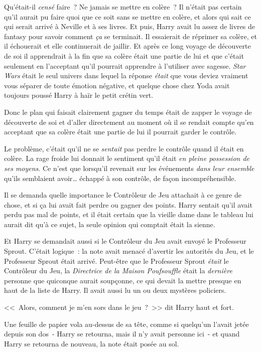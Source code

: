Qu'était-il \emph{censé} faire~? Ne jamais se mettre en colère~? Il n'était pas certain qu'il aurait pu faire quoi que ce soit sans se mettre en colère, et alors qui sait ce qui serait arrivé à Neville et à ses livres. Et puis, Harry avait lu assez de livres de fantasy pour savoir comment \emph{ça} se terminait. Il essaierait de réprimer sa colère, et il échouerait et elle continuerait de jaillir. Et après ce long voyage de découverte de soi il apprendrait à la fin que sa colère était une partie de lui et que c'était seulement en l'acceptant qu'il pourrait apprendre à l'utiliser avec sagesse. \emph{Star Wars} était le seul univers dans lequel la réponse \emph{était} que vous deviez vraiment vous séparer de toute émotion négative, et quelque chose chez Yoda avait toujours poussé Harry à haïr le petit crétin vert.

Donc le plan qui faisait clairement gagner du temps était de zapper le voyage de découverte de soi et d'aller directement au moment où il se rendait compte qu'en acceptant que sa colère était une partie de lui il pourrait garder le contrôle.

Le problème, c'était qu'il ne se \emph{sentait} pas perdre le contrôle quand il était en colère. La rage froide lui donnait le sentiment qu'il était \emph{en pleine possession de ses moyens}. Ce n'est que lorsqu'il revenait sur les événements \emph{dans leur ensemble} qu'ils semblaient avoir… échappé à son contrôle, de façon incompréhensible.

Il se demanda quelle importance le Contrôleur de Jeu attachait à ce genre de chose, et si ça lui avait fait perdre ou gagner des points. Harry sentait qu'il avait perdu pas mal de points, et il était certain que la vieille dame dans le tableau lui aurait dit qu'à ce sujet, la seule opinion qui comptait était la sienne.

Et Harry se demandait aussi si le Contrôleur du Jeu avait envoyé le Professeur Sprout. C'était logique~: la note avait menacé d'avertir les autorités du Jeu, et le Professeur Sprout était arrivé. Peut-être que le Professeur Sprout \emph{était} le Contrôleur du Jeu, la \emph{Directrice de la Maison Poufsouffle} était la \emph{dernière} personne que quiconque aurait soupçonne, ce qui devait la mettre presque en haut de la liste de Harry. Il avait aussi lu un ou deux mystères policiers.

<<~Alors, comment je m'en sors dans le jeu~?~>> dit Harry haut et fort.

Une feuille de papier vola au-dessus de sa tête, comme si quelqu'un l'avait jetée depuis son dos~- Harry se retourna, mais il n'y avait personne ici~- et quand Harry se retourna de nouveau, la note était posée au sol.

